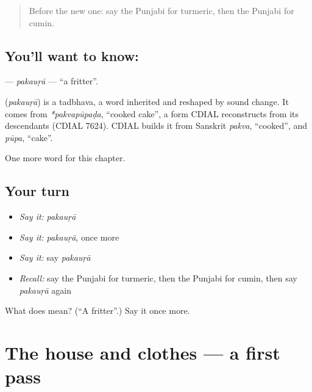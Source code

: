 \begin{quote}
Before the new one: say the Punjabi for turmeric, then the Punjabi for cumin.
\end{quote}

\subsection*{You'll want to know: }
\textbf{} — \emph{pakauṛā} — \textquotedblleft{}a fritter\textquotedblright{}.

\begin{cousinweb}
\textbf{} (\emph{pakauṛā}) is a tadbhava, a word inherited and reshaped by sound change. It comes from \emph{*pakvapūpaḍa}, \textquotedblleft{}cooked cake\textquotedblright{}, a form CDIAL reconstructs from its descendants (CDIAL 7624). CDIAL builds it from Sanskrit \emph{pakva}, \textquotedblleft{}cooked\textquotedblright{}, and \emph{pūpa}, \textquotedblleft{}cake\textquotedblright{}.
\end{cousinweb}

\begin{grammarlens}[title={What you've built}]
One more word for this chapter.
\end{grammarlens}

\subsection*{Your turn}
\begin{itemize}
\raggedright
  \item \emph{Say it:} \emph{pakauṛā}
  \item \emph{Say it:} \emph{pakauṛā}, once more
  \item \emph{Say it:} say \emph{pakauṛā}
  \item \emph{Recall:} say the Punjabi for turmeric, then the Punjabi for cumin, then say \emph{pakauṛā} again
\end{itemize}

\begin{tcolorbox}[breakable,colback=teal!4,colframe=teal!35!black,title={Before you move on}]
What does  mean? (\textquotedblleft{}A fritter\textquotedblright{}.) Say it once more.
\end{tcolorbox}
\section[(dialogue)]{The house and clothes — a first pass}

